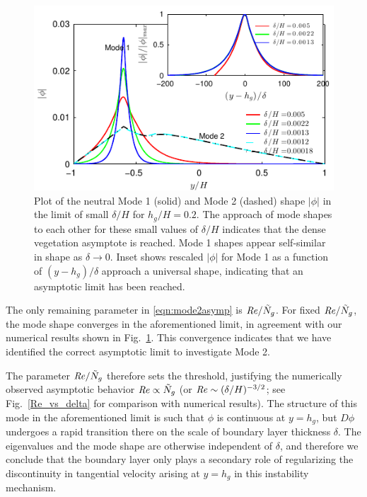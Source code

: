 \documentclass{jfm}
\newcommand{\hg}{h_g}
\newcommand{\Ndg}{\tilde{N}_g}
\begin{document}
\begin{figure}
\includegraphics[]{Asymptotic_noshear}
\caption{
Plot of the neutral Mode 1 (solid) and Mode 2 (dashed) shape $|\phi|$ in the limit of small $\delta/H$ for $\hg/H=0.2$. 
The approach of mode shapes to each other for these small values of $\delta/H$ indicates that the dense vegetation asymptote is reached. 
Mode 1 shapes appear self-similar in shape as $\delta\to 0$.
Inset shows rescaled $|\phi|$ for Mode 1 as a function of $(y-\hg)/\delta$ approach a universal shape, indicating that an asymptotic limit has been reached. 
}
\label{Asymptotic_mode}
\end{figure}
The only remaining parameter in \eqref{eqn:mode2asymp} is $\Rey/\Ndg$. 
For fixed $\Rey/\Ndg$, the mode shape converges in the aforementioned limit, in agreement with our numerical results shown in Fig.~\ref{Asymptotic_mode}.
This convergence indicates that we have identified the correct asymptotic limit to investigate Mode 2.

The parameter $\Rey/\Ndg$ therefore sets the threshold, justifying the numerically observed asymptotic behavior $\Rey \propto \Ndg$ (or $\mbox{\textit{Re}} \sim ({\delta}/{H})^{-3/2}$; see Fig.~\ref{Re_vs_delta} for comparison with numerical results).
The structure of this mode in the aforementioned limit is such that $\phi$ is continuous at $y=h_g$, but $D\phi$ undergoes a rapid transition there on the scale of boundary layer thickness $\delta$.
The eigenvalues and the mode shape are otherwise independent of $\delta$, and therefore we conclude that the boundary layer only plays a secondary role of regularizing the discontinuity in tangential velocity arising at $y=\hg$ in this instability mechanism.
\end{document}

